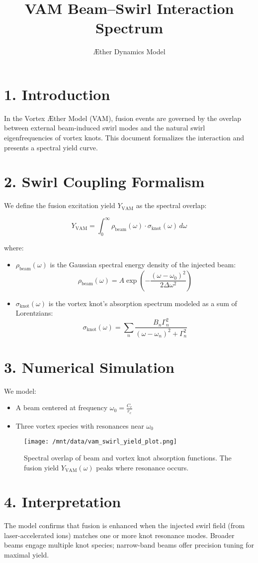 \documentclass{article}
\title{VAM Beam--Swirl Interaction Spectrum}
\author{Æther Dynamics Model}
\date{}
\begin{document}
\maketitle

\section*{1. Introduction}
In the Vortex Æther Model (VAM), fusion events are governed by the overlap between external beam-induced swirl modes and the natural swirl eigenfrequencies of vortex knots. This document formalizes the interaction and presents a spectral yield curve.

\section*{2. Swirl Coupling Formalism}
We define the fusion excitation yield $Y_{\mathrm{VAM}}$ as the spectral overlap:

\begin{equation}
Y_{\mathrm{VAM}} = \int_0^\infty \rho_{\mathrm{beam}}(\omega) \cdot \sigma_{\mathrm{knot}}(\omega) \, d\omega
\end{equation}

\noindent where:
\begin{itemize}
  \item $\rho_{\mathrm{beam}}(\omega)$ is the Gaussian spectral energy density of the injected beam:
  \[
  \rho_{\mathrm{beam}}(\omega) = A \exp\left(-\frac{(\omega - \omega_0)^2}{2 \Delta \omega^2} \right)
  \]
  \item $\sigma_{\mathrm{knot}}(\omega)$ is the vortex knot's absorption spectrum modeled as a sum of Lorentzians:
  \[
  \sigma_{\mathrm{knot}}(\omega) = \sum_n \frac{B_n \Gamma_n^2}{(\omega - \omega_n)^2 + \Gamma_n^2}
  \]
\end{itemize}

\section*{3. Numerical Simulation}
We model:
\begin{itemize}
  \item A beam centered at frequency $\omega_0 = \frac{C_e}{r_c}$
  \item Three vortex species with resonances near $\omega_0$
\end{itemize}

\begin{figure}[h!]
  \centering
  \texttt{[image: /mnt/data/vam\_swirl\_yield\_plot.png]}
  \caption{Spectral overlap of beam and vortex knot absorption functions. The fusion yield $Y_{\mathrm{VAM}}(\omega)$ peaks where resonance occurs.}
\end{figure}

\section*{4. Interpretation}
The model confirms that fusion is enhanced when the injected swirl field (from laser-accelerated ions) matches one or more knot resonance modes. Broader beams engage multiple knot species; narrow-band beams offer precision tuning for maximal yield.
\end{document}
